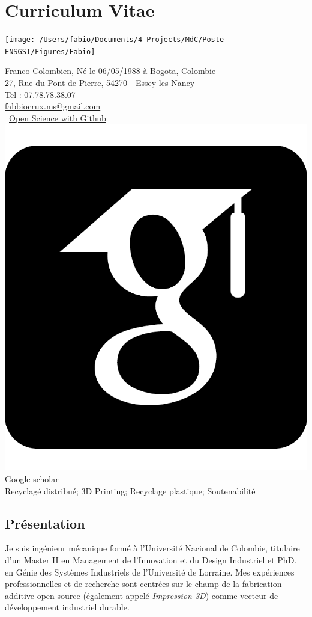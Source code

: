 \documentclass[
  12pt,
  oneside]{book}
\begin{document}
{
\hypersetup{linkcolor=}
\setcounter{tocdepth}{1}
\tableofcontents
}
\hypertarget{curriculum-vitae}{%
\chapter{Curriculum Vitae}\label{curriculum-vitae}}

\begin{minipage}{0.35\linewidth}

\begin{center}\texttt{[image: /Users/fabio/Documents/4-Projects/MdC/Poste-ENSGSI/Figures/Fabio]} \end{center}
\end{minipage}
\begin{minipage}{0.60\linewidth}

Franco-Colombien, Né le 06/05/1988 à Bogota, Colombie  \\
27, Rue du Pont de Pierre, 54270 - Essey-les-Nancy \\
Tel : 07.78.78.38.07 \\


\faEnvelope[regular] \href{mailto:fabbiocrux.ms@gmail.com}{fabbiocrux.ms@gmail.com} \\
\faGithub~\href{https://github.com/fabbiocrux}{Open Science with Github} \\
\includegraphics[width=1.5ex]{Figures/icons/google-scholar-square.pdf}  \href{https://scholar.google.fr/citations?user=8Cuoaf4AAAAJ&hl=fr}{Google scholar} \\


Recyclagé distribué; 3D Printing; Recyclage plastique; Soutenabilité
 
\end{minipage}

\hypertarget{pruxe9sentation}{%
\section{Présentation}\label{pruxe9sentation}}

Je suis ingénieur mécanique formé à l'Université Nacional de Colombie, titulaire d'un Master II en Management de l'Innovation et du Design Industriel et PhD. en Génie des Systèmes Industriels de l'Université de Lorraine. Mes expériences professionnelles et de recherche sont centrées sur le champ de la fabrication additive open source (également appelé \emph{Impression 3D}) comme vecteur de développement industriel durable.
\end{document}
